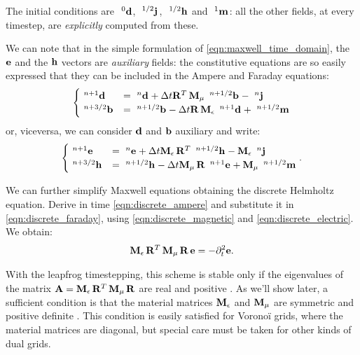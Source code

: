The initial conditions are $\Disc{\Array{d}}{}{0}$,
$\Disc{\Array{j}}{}{1/2}$, $\Disc{\Array{h}}{}{1/2}$ and
$\Disc{\Array{m}}{}{1}$: all the other fields, at every timestep,
are \emph{explicitly} computed from these.

We can note that in the simple formulation of
\eqref{eqn:maxwell_time_domain}, the $\Array{e}$ and the $\Array{h}$
vectors are \emph{auxiliary} fields: the constitutive equations are so
easily expressed that they can be included in the Ampere and
Faraday equations:
\begin{equation*} \begin{cases}
    \Disc{\Array{d}}{}{n+1} & = \Disc{\Array{d}}{}{n} + \deltat
    \Prod{\Transpose{\Matrix{R}}}{\Prod{\Matrix{M}_\mu}{\Disc{\Array{b}}{}{n+1/2}}}
    - \Disc{\Array{j}}{}{n} \\
    \Disc{\Array{b}}{}{n+3/2} & = \Disc{\Array{b}}{}{n+1/2} - \deltat
    \Prod{\Matrix{R}}{\Prod{\Matrix{M}_\epsilon}{\Disc{\Array{d}}{}{n+1}}}
    + \Disc{\Array{m}}{}{n+1/2}
  \end{cases} \end{equation*}
or, viceversa, we can consider $\Array{d}$ and $\Array{b}$ auxiliary
and write:
\begin{equation} \label{eqn:maxwell_time_domain_reduced} \begin{cases}
    \Disc{\Array{e}}{}{n+1} & = \Disc{\Array{e}}{}{n} + \deltat
    \Prod{\Matrix{M}_\epsilon}{\Prod{\Transpose{\Matrix{R}}}{\Disc{\Array{h}}{}{n+1/2}}}
    - \Prod{\Matrix{M}_\epsilon}{\Disc{\Array{j}}{}{n}} \\
    \Disc{\Array{h}}{}{n+3/2} & = \Disc{\Array{h}}{}{n+1/2} - \deltat
    \Prod{\Matrix{M}_\mu}{\Prod{\Matrix{R}}{\Disc{\Array{e}}{}{n+1}}}
    + \Prod{\Matrix{M}_\mu}{\Disc{\Array{m}}{}{n+1/2}}
\end{cases} . \end{equation}

We can further simplify Maxwell equations obtaining the discrete
Helmholtz equation. Derive in time \eqref{eqn:discrete_ampere} and
substitute it in \eqref{eqn:discrete_faraday}, using
\eqref{eqn:discrete_magnetic} and \eqref{eqn:discrete_electric}. We
obtain:
\begin{equation} \label{eqn:discrete_helmholtz}
  \Prod{\Prod{\Matrix{M}_\epsilon}{\Prod{\Transpose{\Matrix{R}}}{\Prod{\Matrix{M}_\mu}{\Matrix{R}}}}}{\Array{e}}
  = -\partial_t^2 \Array{e} .
\end{equation}

With the leapfrog timestepping, this scheme is stable only if the
eigenvalues of the matrix $\Matrix{A} =
\Prod{\Matrix{M}_\epsilon}{\Prod{\Transpose{\Matrix{R}}}{\Prod{\Matrix{M}_\mu}{\Matrix{R}}}}$
are real and positive \cite{liu_fourier}. As we'll show later, a
sufficient condition is that the material matrices
$\Matrix{M}_\epsilon$ and $\Matrix{M}_\mu$ are symmetric and positive
definite \cite{schuhmann_whitney,schuhmann_stability}. This condition
is easily satisfied for Vorono\"i grids, where the material matrices
are diagonal, but special care must be taken for other kinds of dual
grids.


